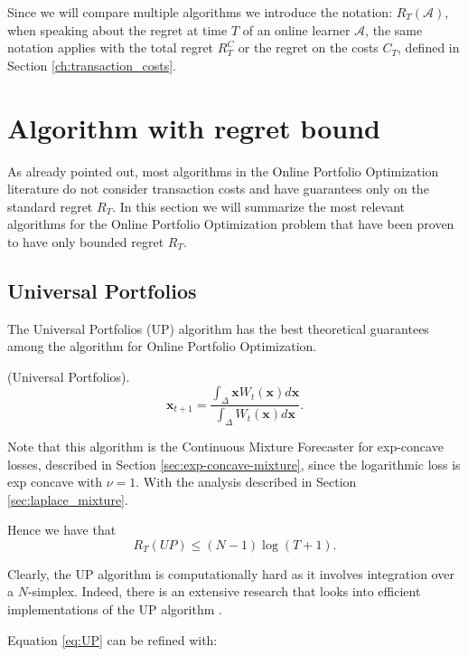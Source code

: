 Since we will compare multiple algorithms we introduce the notation: $R_T(\mathcal A)$, when speaking about the regret at time $T$ of an online learner $\mathcal A$, the same notation applies with the total regret $R_T^C$ or the regret on the costs $C_T$, defined in Section \ref{ch:transaction_costs}.

\section{Algorithm with regret bound}

As already pointed out, most algorithms in the Online Portfolio Optimization literature do not consider transaction costs and have guarantees only on the standard regret $R_T$. In this section we will summarize the most relevant algorithms for the Online Portfolio Optimization problem that have been proven to have only bounded regret $R_T$. 

\subsection{Universal Portfolios}\label{sec:UP}
The Universal Portfolios (UP) \cite{cover1996universal} algorithm has the best theoretical guarantees among the algorithm for Online Portfolio Optimization. 

\begin{definition}(Universal Portfolios).
\begin{equation}\label{eq:UP}
\mathbf x_{t+1}=\frac{\int_{\Delta}\mathbf x W_t(\mathbf x)d\mathbf x}{\int_{\Delta} W_t(\mathbf x)d\mathbf x}.
\end{equation}
\end{definition}

Note that this algorithm is the Continuous Mixture Forecaster for exp-concave losses, described in Section \ref{sec:exp-concave-mixture}, since the logarithmic loss is exp concave with $\nu=1$. With the analysis described in Section \ref{sec:laplace_mixture}.

Hence we have that 
\begin{equation}
R_T(UP)\le(N-1)\log(T+1).
\end{equation}

Clearly, the UP algorithm is computationally hard as it involves integration over a $N$-simplex. Indeed, there is an extensive research that looks into efficient implementations of the UP algorithm \cite{kalai2002efficient}.

Equation \eqref{eq:UP} can be refined with:

